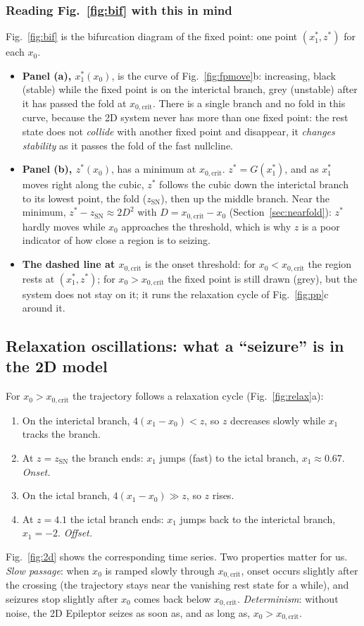 \documentclass[11pt]{article}
\newcommand{\xc}{x_{0,\mathrm{crit}}}
\newcommand{\zsn}{z_{\mathrm{SN}}}
\begin{document}
\subsubsection*{Reading Fig.~\ref{fig:bif} with this in mind}
Fig.~\ref{fig:bif} is the bifurcation diagram of the fixed point: one point $(x_1^*, z^*)$ for each $x_0$.
\begin{itemize}
\item \textbf{Panel (a), $x_1^*(x_0)$}, is the curve of Fig.~\ref{fig:fpmove}b: increasing, black (stable) while the fixed
point is on the interictal branch, grey (unstable) after it has passed the fold at $\xc$. There is a single branch and no
fold in this curve, because the 2D system never has more than one fixed point: the rest state does not \emph{collide} with
another fixed point and disappear, it \emph{changes stability} as it passes the fold of the fast nullcline.
\item \textbf{Panel (b), $z^*(x_0)$}, has a minimum at $\xc$. $z^* = G(x_1^*)$, and as $x_1^*$ moves right along the cubic,
$z^*$ follows the cubic down the interictal branch to its lowest point, the fold ($\zsn$), then up the middle branch. Near
the minimum, $z^* - \zsn\approx 2D^2$ with $D = \xc - x_0$ (Section~\ref{sec:nearfold}): $z^*$ hardly moves while $x_0$
approaches the threshold, which is why $z$ is a poor indicator of how close a region is to seizing.
\item \textbf{The dashed line at $\xc$} is the onset threshold: for $x_0<\xc$ the region rests at $(x_1^*, z^*)$; for
$x_0>\xc$ the fixed point is still drawn (grey), but the system does not stay on it; it runs the relaxation cycle of
Fig.~\ref{fig:pp}c around it.
\end{itemize}

\subsection{Relaxation oscillations: what a ``seizure'' is in the 2D model}
For $x_0 > \xc$ the trajectory follows a relaxation cycle (Fig.~\ref{fig:relax}a):
\begin{enumerate}
\item On the interictal branch, $4(x_1 - x_0) < z$, so $z$ decreases slowly while $x_1$ tracks the branch.
\item At $z=\zsn$ the branch ends: $x_1$ jumps (fast) to the ictal branch, $x_1\approx0.67$. \emph{Onset.}
\item On the ictal branch, $4(x_1 - x_0) \gg z$, so $z$ rises.
\item At $z = 4.1$ the ictal branch ends: $x_1$ jumps back to the interictal branch, $x_1 = -2$. \emph{Offset.}
\end{enumerate}
Fig.~\ref{fig:2d} shows the corresponding time series. Two properties matter for us.
\emph{Slow passage}: when $x_0$ is ramped slowly through $\xc$, onset occurs slightly after the crossing (the
trajectory stays near the vanishing rest state for a while), and seizures stop slightly after $x_0$ comes back
below $\xc$. \emph{Determinism}: without noise, the 2D Epileptor seizes as soon as, and as long as, $x_0 > \xc$.
\end{document}
